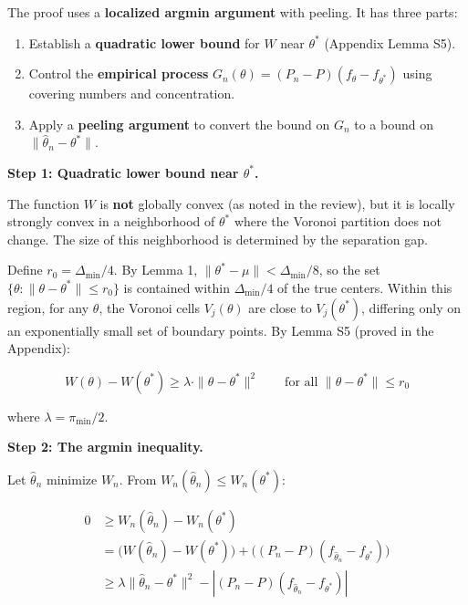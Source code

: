 \documentclass[
  12pt,
]{article}
\providecommand{\tightlist}{%
  \setlength{\itemsep}{0pt}\setlength{\parskip}{0pt}}
\begin{document}
The proof uses a \textbf{localized argmin argument} with peeling. It has
three parts:

\begin{enumerate}
\def\labelenumi{\arabic{enumi}.}
\tightlist
\item
  Establish a \textbf{quadratic lower bound} for \(W\) near \(\theta^*\)
  (Appendix Lemma S5).
\item
  Control the \textbf{empirical process}
  \(G_n(\theta) = (P_n - P)(f_\theta - f_{\theta^*})\) using covering
  numbers and concentration.
\item
  Apply a \textbf{peeling argument} to convert the bound on \(G_n\) to a
  bound on \(\|\hat{\theta}_n - \theta^*\|\).
\end{enumerate}

\textbf{Step 1: Quadratic lower bound near \(\theta^*\).}

The function \(W\) is \textbf{not} globally convex (as noted in the
review), but it is locally strongly convex in a neighborhood of
\(\theta^*\) where the Voronoi partition does not change. The size of
this neighborhood is determined by the separation gap.

Define \(r_0 = \Delta_{\min}/4\). By Lemma 1,
\(\|\theta^* - \mu\| < \Delta_{\min}/8\), so the set
\(\{\theta : \|\theta - \theta^*\| \leq r_0\}\) is contained within
\(\Delta_{\min}/4\) of the true centers. Within this region, for any
\(\theta\), the Voronoi cells \(V_j(\theta)\) are close to
\(V_j(\theta^*)\), differing only on an exponentially small set of
boundary points. By Lemma S5 (proved in the Appendix):

\[W(\theta) - W(\theta^*) \geq \lambda \cdot \|\theta - \theta^*\|^2 \qquad \text{for all } \|\theta - \theta^*\| \leq r_0 \tag{2}\]

where \(\lambda = \pi_{\min} / 2\).

\textbf{Step 2: The argmin inequality.}

Let \(\hat{\theta}_n\) minimize \(W_n\). From
\(W_n(\hat{\theta}_n) \leq W_n(\theta^*)\):

\[\begin{aligned}
0 &\geq W_n(\hat{\theta}_n) - W_n(\theta^*) \\
&= \bigl(W(\hat{\theta}_n) - W(\theta^*)\bigr) + \bigl((P_n-P)(f_{\hat{\theta}_n} - f_{\theta^*})\bigr) \\
&\geq \lambda \|\hat{\theta}_n - \theta^*\|^2 - |(P_n-P)(f_{\hat{\theta}_n} - f_{\theta^*})|
\end{aligned}\]
\end{document}
